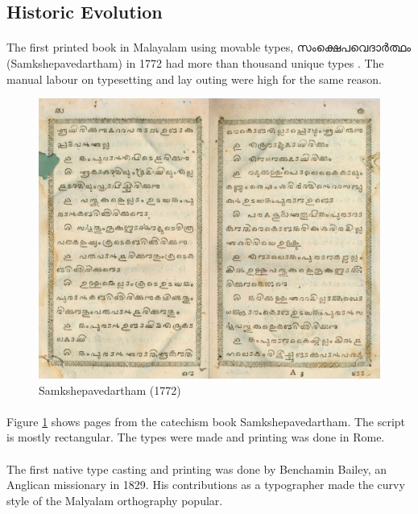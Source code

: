 \documentclass[10pt]{article}
\begin{document}
\subsection{Historic Evolution}

\paragraph{}
The first printed book in Malayalam using movable types, \begingroup \manjari സംക്ഷെപവെദാർത്ഥം \endgroup (Samkshepavedartham) in 1772 had more than thousand unique types \cite{}. The manual labour on typesetting and lay outing were high for the same reason. 

\begin{figure}[ht]
  \centering
   \includegraphics[width=\textwidth]{images/samkshepavedartham1772.png}
     \caption{Samkshepavedartham (1772)}
	\label{Samkshepam}
\end{figure}

\paragraph{}
Figure \ref{Samkshepam} shows pages from the catechism book  Samkshepavedartham.  The script is mostly rectangular. The types were made and printing was done in Rome.

\paragraph{}
The first native type casting and printing was done by Benchamin Bailey, an Anglican missionary in 1829.   His contributions as a typographer made the curvy style of the  Malyalam orthography popular. 
\end{document}
